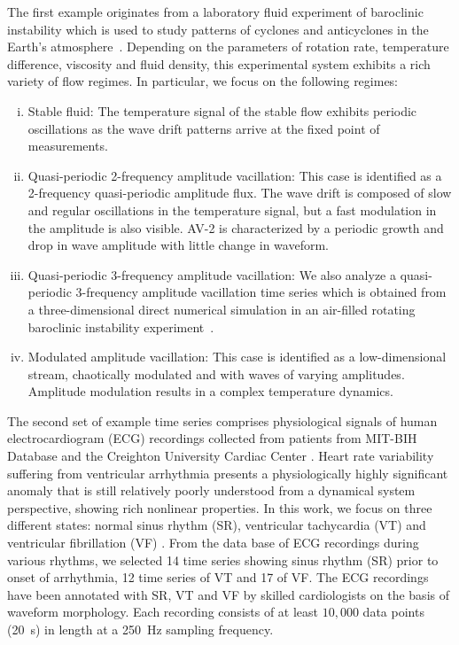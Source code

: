 \documentclass[12pt,aip,cha,reprint,nofootinbib]{revtex4-1}
\begin{document}
The first example originates from a laboratory fluid experiment of baroclinic instability which is used to study patterns of cyclones and anticyclones in the Earth's atmosphere~\cite{Read_jfm_1992,ZouEPJST2008}. Depending on the parameters of rotation rate, temperature difference, viscosity and fluid density, this experimental system exhibits a rich variety of flow regimes. In particular, we focus on the following regimes: 
\begin{enumerate}[(i)]
\item {Stable fluid:} The temperature signal of the stable flow exhibits periodic oscillations as the wave drift patterns arrive at the fixed point of measurements. 
\item {Quasi-periodic 2-frequency amplitude vacillation:} This case is identified as a 2-frequency quasi-periodic amplitude flux. The wave drift is composed of slow and regular oscillations in the temperature signal, but a fast modulation in the amplitude is also visible. AV-2 is characterized by a periodic growth and drop in wave amplitude with little change in waveform. 
\item {Quasi-periodic 3-frequency amplitude vacillation:} We also analyze a quasi-periodic 3-frequency amplitude vacillation time series which is obtained from a three-dimensional direct numerical simulation in an air-filled rotating baroclinic instability experiment~\cite{Read_jfm_1992}. 
\item {Modulated amplitude vacillation:} This case is identified as a low-dimensional stream, chaotically modulated and with waves of varying amplitudes. Amplitude modulation results in a complex temperature dynamics.
\end{enumerate}

The second set of example time series comprises physiological signals of human electrocardiogram (ECG) recordings collected from patients from MIT-BIH Database and the Creighton University Cardiac Center \cite{GoldbergerMITBIH2000}. Heart rate variability suffering from ventricular arrhythmia presents a physiologically highly significant anomaly that is still relatively poorly understood from a dynamical system perspective, showing rich nonlinear properties. In this work, we focus on three different states: normal sinus rhythm (SR), ventricular tachycardia (VT) and ventricular fibrillation (VF) \cite{smallCSF2002}. From the data base of ECG recordings during various rhythms, we selected 14 time series showing sinus rhythm (SR) prior to onset of arrhythmia, 12 time series of VT and 17 of VF. The ECG recordings have been annotated with SR, VT and VF by skilled cardiologists on the basis of waveform morphology. Each recording consists of at least $10,000$ data points (20~s) in length at a 250~Hz sampling frequency. 
\end{document}
